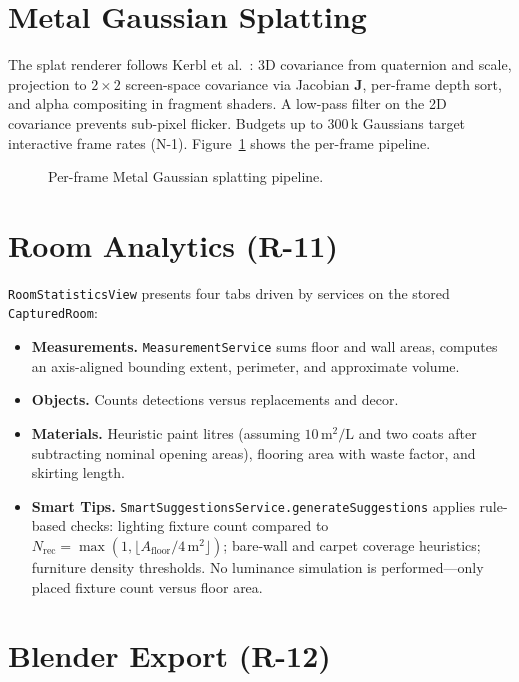 \section{Metal Gaussian Splatting}
\label{sec:splat_rendering}

The splat renderer follows Kerbl et al.\ \cite{kerbl20233dgs}: 3D covariance from quaternion and scale, projection to $2\times2$ screen-space covariance via Jacobian $\mathbf{J}$, per-frame depth sort, and alpha compositing in fragment shaders. A low-pass filter on the 2D covariance prevents sub-pixel flicker. Budgets up to 300\,k Gaussians target interactive frame rates (N-1). Figure~\ref{fig:splat_pipeline} shows the per-frame pipeline.

\begin{figure}[htbp]
\centering
{}
\caption{Per-frame Metal Gaussian splatting pipeline.}
\label{fig:splat_pipeline}
\end{figure}

\section{Room Analytics (R-11)}
\label{sec:analytics}

\texttt{RoomStatisticsView} presents four tabs driven by services on the stored \texttt{CapturedRoom}:

\begin{itemize}
    \item \textbf{Measurements.} \texttt{MeasurementService} sums floor and wall areas, computes an axis-aligned bounding extent, perimeter, and approximate volume.
    \item \textbf{Objects.} Counts detections versus replacements and decor.
    \item \textbf{Materials.} Heuristic paint litres (assuming $10\,\mathrm{m}^2/\mathrm{L}$ and two coats after subtracting nominal opening areas), flooring area with waste factor, and skirting length.
    \item \textbf{Smart Tips.} \texttt{SmartSuggestionsService.generateSuggestions} applies rule-based checks: lighting fixture count compared to $N_{\mathrm{rec}} = \max(1, \lfloor A_{\mathrm{floor}} / 4\,\mathrm{m}^2 \rfloor)$; bare-wall and carpet coverage heuristics; furniture density thresholds. No luminance simulation is performed---only placed fixture count versus floor area.
\end{itemize}

\section{Blender Export (R-12)}
\label{sec:blender_export}

